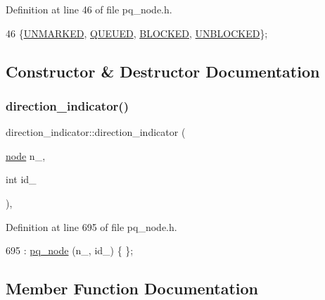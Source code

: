Definition at line 46 of file pq\+\_\+node.\+h.


\begin{DoxyCode}
46 \{\mbox{\hyperlink{classpq__node_a6236b20cd5f6cc02cb5f637ed34c96d9a7fbe5f6a363f9f2b5a154c61b2389d59}{UNMARKED}}, \mbox{\hyperlink{classpq__node_a6236b20cd5f6cc02cb5f637ed34c96d9a8fcc16097c37da3379fcd0a0c16fe169}{QUEUED}}, \mbox{\hyperlink{classpq__node_a6236b20cd5f6cc02cb5f637ed34c96d9a70312622ded9f04f068838ec195fc53c}{BLOCKED}}, \mbox{\hyperlink{classpq__node_a6236b20cd5f6cc02cb5f637ed34c96d9a8a88820f8cee58f43fef7160cdf1d7dc}{UNBLOCKED}}\};
\end{DoxyCode}


\subsection{Constructor \& Destructor Documentation}
\mbox{\label{classdirection__indicator_a9b5f07e3052704b46790c26205c03583}} 
\subsubsection{\texorpdfstring{direction\+\_\+indicator()}{direction\_indicator()}}
{\footnotesize\ttfamily direction\+\_\+indicator\+::direction\+\_\+indicator (\begin{DoxyParamCaption}\item[{\mbox{\hyperlink{classnode}{node}}}]{n\+\_\+,  }\item[{int}]{id\+\_\+ }\end{DoxyParamCaption})\hspace{0.3cm}{\ttfamily [inline]}, {\ttfamily [private]}}



Definition at line 695 of file pq\+\_\+node.\+h.


\begin{DoxyCode}
695 : \mbox{\hyperlink{classpq__node_a75720c94fd6e2865ba24c76ff66b33b2}{pq\_node}} (n\_, id\_) \{ \};
\end{DoxyCode}


\subsection{Member Function Documentation}
\mbox{\label{classpq__node_a13100e0b030cc047f382d9ddf6a44f4a}} 
